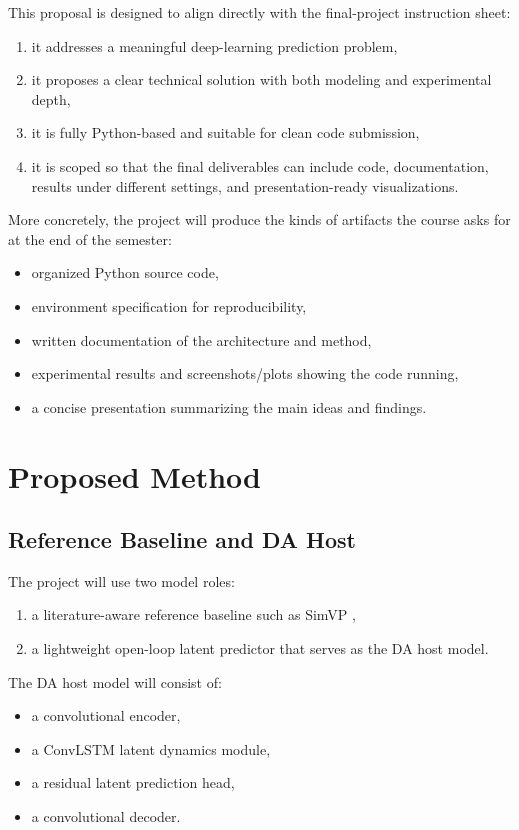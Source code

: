 \documentclass{article}
\begin{document}
This proposal is designed to align directly with the final-project instruction sheet:
\begin{enumerate}[leftmargin=1.2em]
    \item it addresses a meaningful deep-learning prediction problem,
    \item it proposes a clear technical solution with both modeling and experimental depth,
    \item it is fully Python-based and suitable for clean code submission,
    \item it is scoped so that the final deliverables can include code, documentation, results under different settings, and presentation-ready visualizations.
\end{enumerate}

More concretely, the project will produce the kinds of artifacts the course asks for at the end of the semester:
\begin{itemize}[leftmargin=1.2em]
    \item organized Python source code,
    \item environment specification for reproducibility,
    \item written documentation of the architecture and method,
    \item experimental results and screenshots/plots showing the code running,
    \item a concise presentation summarizing the main ideas and findings.
\end{itemize}

\section{Proposed Method}

\subsection{Reference Baseline and DA Host}

The project will use two model roles:
\begin{enumerate}[leftmargin=1.2em]
    \item a literature-aware reference baseline such as SimVP \citep{gao2022simvp},
    \item a lightweight open-loop latent predictor that serves as the DA host model.
\end{enumerate}

The DA host model will consist of:
\begin{itemize}[leftmargin=1.2em]
    \item a convolutional encoder,
    \item a ConvLSTM latent dynamics module,
    \item a residual latent prediction head,
    \item a convolutional decoder.
\end{itemize}
\end{document}
